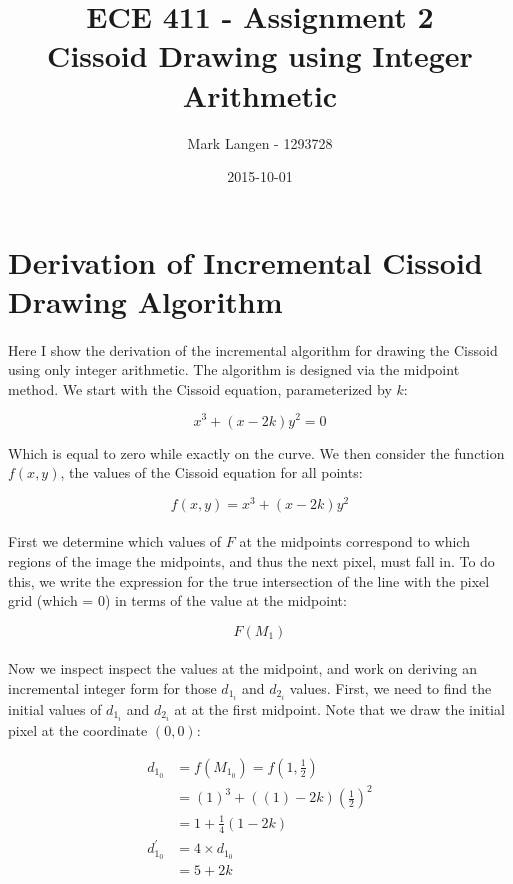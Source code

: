 \documentclass[12pt]{article}
\title{ECE 411 - Assignment 2\\Cissoid Drawing using Integer Arithmetic}
\date{2015-10-01}
\author{Mark Langen - 1293728}
\begin{document}
	\maketitle
	\newpage

	\section{Derivation of Incremental Cissoid Drawing Algorithm}
	\paragraph{}
	Here I show the derivation of the incremental algorithm for drawing the Cissoid using only integer arithmetic. The algorithm is designed via the midpoint method. We start with the Cissoid equation, parameterized by $k$:
	
	$$x^3 + (x - 2k)y^2 = 0$$
	
	Which is equal to zero while exactly on the curve. We then consider the function $f(x, y)$, the values of the Cissoid equation for all points: 
	
	$$ f(x, y) = x^3 + (x - 2k)y^2 $$
	
	\paragraph{}
	First we determine which values of $F$ at the midpoints correspond to which regions of the image the midpoints, and thus the next pixel, must fall in. To do this, we write the expression for the true intersection of the line with the pixel grid (which = 0) in terms of the value at the midpoint:
	
	$$ F(M_1) $$
	
	\paragraph{}
	Now we inspect inspect the values at the midpoint, and work on deriving an incremental integer form for those $d_{1_i}$ and $d_{2_i}$ values. First, we need to find the initial values of $d_{1_i}$ and $d_{2_i}$ at at the first midpoint. Note that we draw the initial pixel at the coordinate $(0, 0)$:
	
	\begin{equation}
	\begin{aligned}
		d_{1_0} &= f(M_{1_0}) = f(1, \tfrac{1}{2}) \\
		        &= (1)^3 + ((1) - 2k)(\tfrac{1}{2})^2 \\
		        &= 1 + \tfrac{1}{4}(1 - 2k) \\
		d_{1_0}^{'} &= 4\times d_{1_0} \\
		            &= 5 + 2k
 	\end{aligned}
	\end{equation}	
	
\end{document}
